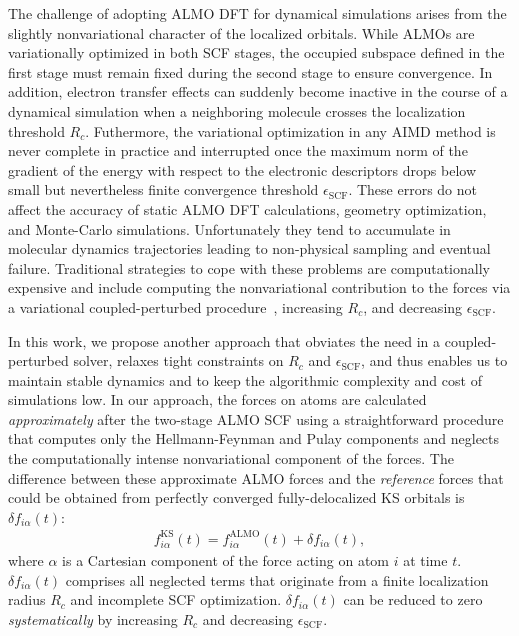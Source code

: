 \documentclass[aip,jcp,reprint,amsmath,amssymb]{revtex4-1}
\begin{document}
The challenge of adopting ALMO DFT for dynamical simulations arises from the slightly nonvariational character of the localized orbitals. While ALMOs are variationally optimized in both SCF stages, the occupied subspace defined in the first stage must remain fixed during the second stage to ensure convergence. In addition, electron transfer effects can suddenly become inactive in the course of a dynamical simulation when a neighboring molecule crosses the localization threshold $R_{c}$. Futhermore, the variational optimization in any AIMD method is never complete in practice and interrupted once the maximum norm of the gradient of the energy with respect to the electronic descriptors drops below small but nevertheless finite convergence threshold $\epsilon_{\text{SCF}}$. These errors do not affect the accuracy of static ALMO DFT calculations, geometry optimization, and Monte-Carlo simulations. Unfortunately they tend to accumulate in molecular dynamics trajectories leading to non-physical sampling and eventual failure. 
Traditional strategies to cope with these problems are computationally expensive and include computing the nonvariational contribution to the forces via a variational coupled-perturbed procedure~\cite{Kussmann2013,Benoit2001}, increasing $R_c$, and decreasing $\epsilon_{\text{SCF}}$. 

In this work, we propose another approach that obviates the need in a coupled-perturbed solver, relaxes tight constraints on $R_{c}$ and $\epsilon_{\text{SCF}}$, and thus enables us to maintain stable dynamics and to keep the algorithmic complexity and cost of simulations low. 
%
In our approach, the forces on atoms are calculated \emph{approximately} after the two-stage ALMO SCF using a straightforward procedure that computes only the Hellmann-Feynman and Pulay components and neglects the computationally intense nonvariational component of the forces. 
The difference between these approximate ALMO forces and the \emph{reference} forces that could be obtained from perfectly converged fully-delocalized KS orbitals is $\delta f_{i\alpha}(t)$:
%
\begin{align}
\label{eq:deltaf}
f^{\text{KS}}_{i\alpha}(t) = f^{\text{ALMO}}_{i\alpha}(t) + \delta f_{i\alpha} (t),
\end{align}
%
where $\alpha$ is a Cartesian component of the force acting on atom $i$ at time $t$. $\delta f_{i\alpha} (t)$ comprises all neglected terms that originate from a finite localization radius $R_c$ and incomplete SCF optimization. 
$\delta f_{i\alpha} (t)$ can be reduced to zero \emph{systematically} by increasing $R_c$ and decreasing $\epsilon_{\text{SCF}}$.
\end{document}
